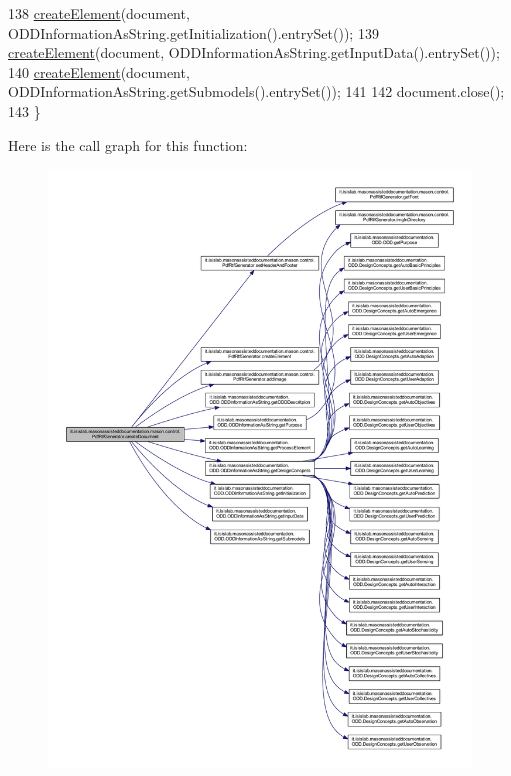 \begin{DoxyCode}
138         \hyperlink{classit_1_1isislab_1_1masonassisteddocumentation_1_1mason_1_1control_1_1_pdf_rtf_generator_ad3127f275f1af4f9d92f314fb3f29f51}{createElement}(document, ODDInformationAsString.getInitialization().entrySet());
139         \hyperlink{classit_1_1isislab_1_1masonassisteddocumentation_1_1mason_1_1control_1_1_pdf_rtf_generator_ad3127f275f1af4f9d92f314fb3f29f51}{createElement}(document, ODDInformationAsString.getInputData().entrySet());
140         \hyperlink{classit_1_1isislab_1_1masonassisteddocumentation_1_1mason_1_1control_1_1_pdf_rtf_generator_ad3127f275f1af4f9d92f314fb3f29f51}{createElement}(document, ODDInformationAsString.getSubmodels().entrySet()); 
141         
142         document.close();
143     \}
\end{DoxyCode}


Here is the call graph for this function\-:\nopagebreak
\begin{figure}[H]
\begin{center}
\leavevmode
\includegraphics[width=350pt]{classit_1_1isislab_1_1masonassisteddocumentation_1_1mason_1_1control_1_1_pdf_rtf_generator_add23c0e308cdf54a3c1e3a8128ea29ed_cgraph}
\end{center}
\end{figure}





